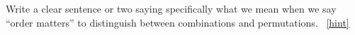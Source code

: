 \documentclass{book}
\begin{document}
\setcounter{project}{118}
\addtocounter{project}{-1}
\begin{activity}[]\label{activity-111}
\hypertarget{p-838}{}%
Write a clear sentence or two saying specifically what we mean when we say ``order matters'' to distinguish between combinations and permutations.%
~\hfill{\tiny\hyperlink{a-118}{[hint]}\hypertarget{q-118}{}}\end{activity}
\end{document}
